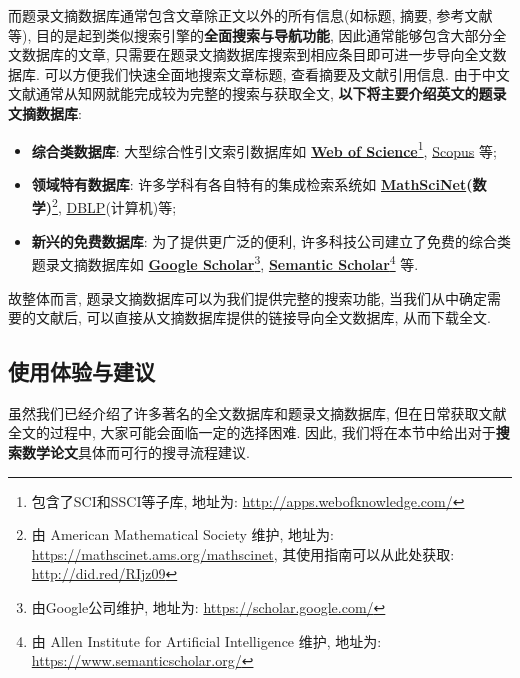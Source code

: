 \documentclass{formatBook}
\begin{document}
而题录文摘数据库通常包含文章除正文以外的所有信息(如标题, 摘要, 参考文献等), 目的是起到类似搜索引擎的\textbf{全面搜索与导航功能}, 因此通常能够包含大部分全文数据库的文章, 只需要在题录文摘数据库搜索到相应条目即可进一步导向全文数据库. 可以方便我们快速全面地搜索文章标题, 查看摘要及文献引用信息. 由于中文文献通常从知网就能完成较为完整的搜索与获取全文, \textbf{以下将主要介绍英文的题录文摘数据库}:
\begin{itemize}
    \item \textbf{综合类数据库}: 大型综合性引文索引数据库如 \textbf{\href{http://apps.webofknowledge.com/}{Web of Science}}\footnote{包含了SCI和SSCI等子库, 地址为: \url{http://apps.webofknowledge.com/}}, \href{https://www.scopus.com/}{Scopus} 等;
    \item \textbf{领域特有数据库}: 许多学科有各自特有的集成检索系统如 \textbf{\href{https://mathscinet.ams.org/mathscinet}{MathSciNet}(数学)}\footnote{由 American Mathematical Society 维护, 地址为: \url{https://mathscinet.ams.org/mathscinet}, 其使用指南可以从此处获取: \url{http://did.red/RIjz09}}, \href{https://dblp.uni-trier.de/}{DBLP}(计算机)等;
    \item \textbf{新兴的免费数据库}: 为了提供更广泛的便利, 许多科技公司建立了免费的综合类题录文摘数据库如 \textbf{\href{https://scholar.google.com/}{Google Scholar}}\footnote{由Google公司维护, 地址为: \url{https://scholar.google.com/}}, \textbf{\href{https://www.semanticscholar.org/}{Semantic Scholar}}\footnote{由 Allen Institute for Artificial Intelligence 维护, 地址为: \url{https://www.semanticscholar.org/}} 等.
\end{itemize}

故整体而言, 题录文摘数据库可以为我们提供完整的搜索功能, 当我们从中确定需要的文献后, 可以直接从文摘数据库提供的链接导向全文数据库, 从而下载全文.

\subsection{使用体验与建议}
虽然我们已经介绍了许多著名的全文数据库和题录文摘数据库, 但在日常获取文献全文的过程中, 大家可能会面临一定的选择困难. 因此, 我们将在本节中给出对于\textbf{搜索数学论文}具体而可行的搜寻流程建议.
\end{document}
